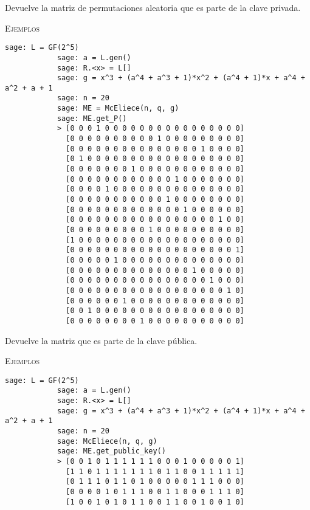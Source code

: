 \begin{description}[leftmargin=1em, font=\normalfont\ttfamily, style=nextline]
\begin{description}[font=\ttfamily, style=nextline]
        \item[get\_P(self)] Devuelve la matriz de permutaciones aleatoria que es parte de la clave privada.

        \textsc{Ejemplos}
        \begin{lstlisting}[gobble=4]
            sage: L = GF(2^5)
            sage: a = L.gen()
            sage: R.<x> = L[]
            sage: g = x^3 + (a^4 + a^3 + 1)*x^2 + (a^4 + 1)*x + a^4 + a^2 + a + 1
            sage: n = 20
            sage: ME = McEliece(n, q, g)
            sage: ME.get_P()
            > [0 0 0 1 0 0 0 0 0 0 0 0 0 0 0 0 0 0 0 0]
              [0 0 0 0 0 0 0 0 0 0 1 0 0 0 0 0 0 0 0 0]
              [0 0 0 0 0 0 0 0 0 0 0 0 0 0 0 1 0 0 0 0]
              [0 1 0 0 0 0 0 0 0 0 0 0 0 0 0 0 0 0 0 0]
              [0 0 0 0 0 0 0 1 0 0 0 0 0 0 0 0 0 0 0 0]
              [0 0 0 0 0 0 0 0 0 0 0 0 1 0 0 0 0 0 0 0]
              [0 0 0 0 1 0 0 0 0 0 0 0 0 0 0 0 0 0 0 0]
              [0 0 0 0 0 0 0 0 0 0 0 1 0 0 0 0 0 0 0 0]
              [0 0 0 0 0 0 0 0 0 0 0 0 0 1 0 0 0 0 0 0]
              [0 0 0 0 0 0 0 0 0 0 0 0 0 0 0 0 0 1 0 0]
              [0 0 0 0 0 0 0 0 0 1 0 0 0 0 0 0 0 0 0 0]
              [1 0 0 0 0 0 0 0 0 0 0 0 0 0 0 0 0 0 0 0]
              [0 0 0 0 0 0 0 0 0 0 0 0 0 0 0 0 0 0 0 1]
              [0 0 0 0 0 1 0 0 0 0 0 0 0 0 0 0 0 0 0 0]
              [0 0 0 0 0 0 0 0 0 0 0 0 0 0 1 0 0 0 0 0]
              [0 0 0 0 0 0 0 0 0 0 0 0 0 0 0 0 1 0 0 0]
              [0 0 0 0 0 0 0 0 0 0 0 0 0 0 0 0 0 0 1 0]
              [0 0 0 0 0 0 1 0 0 0 0 0 0 0 0 0 0 0 0 0]
              [0 0 1 0 0 0 0 0 0 0 0 0 0 0 0 0 0 0 0 0]
              [0 0 0 0 0 0 0 0 1 0 0 0 0 0 0 0 0 0 0 0]
        \end{lstlisting}

        \item[get\_public\_key(self)] Devuelve la matriz que es parte de la clave pública.

        \textsc{Ejemplos}
        \begin{lstlisting}[gobble=4]
            sage: L = GF(2^5)
            sage: a = L.gen()
            sage: R.<x> = L[]
            sage: g = x^3 + (a^4 + a^3 + 1)*x^2 + (a^4 + 1)*x + a^4 + a^2 + a + 1
            sage: n = 20
            sage: McEliece(n, q, g)
            sage: ME.get_public_key()
            > [0 0 1 0 1 1 1 1 1 1 0 0 0 1 0 0 0 0 0 1]
              [1 1 0 1 1 1 1 1 1 1 0 1 1 0 0 1 1 1 1 1]
              [0 1 1 1 0 1 1 0 1 0 0 0 0 0 1 1 1 0 0 0]
              [0 0 0 0 1 0 1 1 1 0 0 1 1 0 0 0 1 1 1 0]
              [1 0 0 1 0 1 0 1 1 0 0 1 1 0 0 1 0 0 1 0]
        \end{lstlisting}


\end{description}
\end{description}
